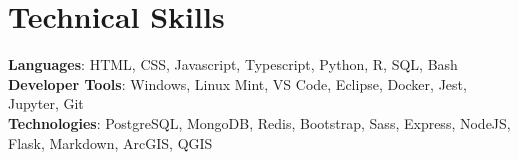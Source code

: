 \documentclass[letterpaper,11pt]{article}
\begin{document}
%
\section{Technical Skills}
 \begin{itemize}[leftmargin=0.15in, label={}]
    \small{\item{
     \textbf{Languages}{: HTML, CSS, Javascript, Typescript, Python, R, SQL, Bash} \\
     \textbf{Developer Tools}{: Windows, Linux Mint, VS Code, Eclipse, Docker, Jest, Jupyter, Git} \\
     \textbf{Technologies}{: PostgreSQL, MongoDB, Redis, Bootstrap, Sass, Express, NodeJS, Flask, Markdown, ArcGIS, QGIS} \\
    }}
 \end{itemize}
 \vspace{-16pt}
\end{document}
